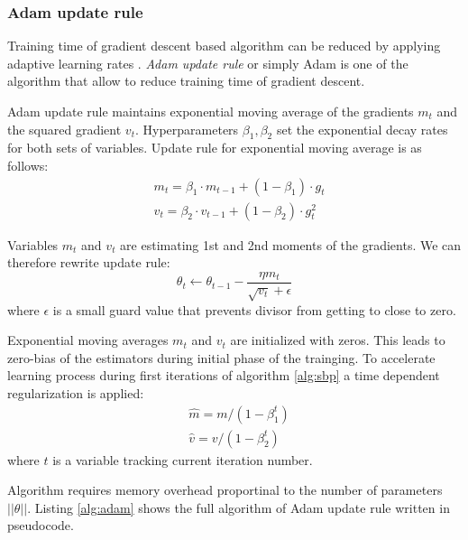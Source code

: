 \subsubsection{Adam update rule}

Training time of gradient descent based algorithm can be reduced by applying adaptive learning rates \cite{Kingma2015}.
\textit{Adam update rule} or simply Adam is one of the algorithm that allow to reduce training time of gradient descent.

Adam update rule maintains exponential moving average of the gradients $m_t$ and the squared gradient $v_t$.
Hyperparameters $\beta_1, \beta_2$ set the exponential decay rates for both sets of variables.
Update rule for exponential moving average is as follows:
\begin{equation*}
  \begin{aligned}
    & m_t = \beta_1 \cdot m_{t-1} + (1-\beta_1) \cdot g_t \\
    & v_t = \beta_2 \cdot v_{t-1} + (1-\beta_2) \cdot g_t^2
  \end{aligned}
\end{equation*}

Variables $m_t$ and $v_t$ are estimating 1st and 2nd moments of the gradients.
We can therefore rewrite update rule:
\begin{equation}
  \theta_t \gets \theta_{t-1} - \frac{\eta m_t}{\sqrt{v_t} + \epsilon}
\end{equation}
where $\epsilon$ is a small guard value that prevents divisor from getting to close to zero.

Exponential moving averages $m_t$ and $v_t$ are initialized with zeros.
This leads to zero-bias of the estimators during initial phase of the trainging.
To accelerate learning process during first iterations of algorithm \ref{alg:sbp} a time dependent regularization is applied:
\begin{equation*}
  \begin{aligned}
    & \hat{m} = m / (1-\beta_1^t) \\
    & \hat{v} = v/(1-\beta_2^t)
  \end{aligned}
\end{equation*}
where $t$ is a variable tracking current iteration number.

Algorithm requires memory overhead proportinal to the number of parameters $||\theta||$. Listing \ref{alg:adam} shows the full algorithm of Adam update rule written in pseudocode.



